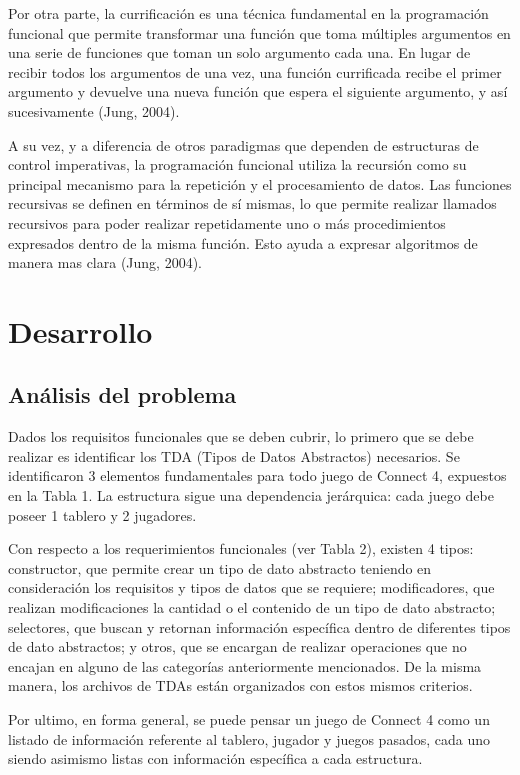 \documentclass[12pt]{article}
\begin{document}
    Por otra parte, la currificación es una técnica fundamental en la programación funcional que permite transformar una función que toma múltiples argumentos en una serie de funciones que toman un solo argumento cada una. En lugar de recibir todos los argumentos de una vez, una función currificada recibe el primer argumento y devuelve una nueva función que espera el siguiente argumento, y así sucesivamente (Jung, 2004).
    
    A su vez, y a diferencia de otros paradigmas que dependen de estructuras de control imperativas, la programación funcional utiliza la recursión como su principal mecanismo para la repetición y el procesamiento de datos. Las funciones recursivas se definen en términos de sí mismas, lo que permite realizar llamados recursivos para poder realizar repetidamente uno o más procedimientos expresados dentro de la misma función. Esto ayuda a expresar algoritmos de manera mas clara (Jung, 2004).
	
    \section{Desarrollo}
    
    \subsection{Análisis del problema}
    
    Dados los requisitos funcionales que se deben cubrir, lo primero que se debe realizar es identificar los TDA (Tipos de Datos Abstractos) necesarios. Se identificaron 3 elementos fundamentales para todo juego de Connect 4, expuestos en la Tabla 1. La estructura sigue una dependencia jerárquica: cada juego debe poseer 1 tablero y 2 jugadores. 
    
    Con respecto a los requerimientos funcionales (ver Tabla 2), existen 4 tipos: constructor, que permite crear un tipo de dato abstracto  teniendo en consideración los requisitos y tipos de datos que se requiere; modificadores, que realizan modificaciones la cantidad o el contenido de un tipo de dato abstracto; selectores, que buscan y retornan información específica dentro de diferentes tipos de dato abstractos; y otros, que se encargan de realizar operaciones que no encajan en alguno de las categorías anteriormente mencionados. De la misma manera, los archivos de TDAs están organizados con estos mismos criterios.
    
    Por ultimo, en forma general, se puede pensar un juego de Connect 4 como un listado de información referente al tablero, jugador y juegos pasados, cada uno siendo asimismo listas con información específica a cada estructura.
    
\end{document}
